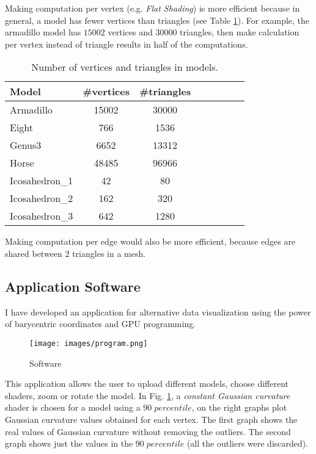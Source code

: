 Making computation per vertex (e.g. \textit{Flat Shading}) is more efficient because in general, a model has fewer vertices than triangles (see Table \ref{table:model-table-vertices}).
For example, the armadillo model has $15002$ vertices and $30000$ triangles, then make calculation per vertex instead of triangle results in half of the computations.

\begin{table}[!h]
    \centering
\begin{tabular}{l*{6}{c}r}
    \centering
    Model              & \#vertices & \#triangles \\
    \hline
    Armadillo          & 15002 & 30000 \\
    Eight              & 766 & 1536 \\
    Genus3             & 6652 & 13312  \\
    Horse              & 48485 &  96966\\
    Icosahedron\_1      &  42 & 80 \\
    Icosahedron\_2      &  162 & 320 \\
    Icosahedron\_3      & 642 &  1280
\end{tabular}
\caption{Number of vertices and triangles in models.}
\label{table:model-table-vertices}
\end{table}

Making computation per edge would also be more efficient, because edges are shared between $2$ triangles in a mesh.

\subsection{Application Software}
I have developed an application for alternative data visualization using the power of barycentric coordinates and GPU programming.
\begin{figure}[!h]
    \texttt{[image: images/program.png]}
    \caption{Software}
    \label{fig:software}
\end{figure}
This application allows the user to upload different models, choose different shaders, zoom or rotate the model.
In Fig. \ref{fig:software}, a \textit{constant Gaussian curvature} shader is chosen for a model using a $90 \; percentile$, on the right graphs plot Gaussian curvature values obtained for each vertex. The first graph shows the real values of Gaussian curvature without removing the outliers. The second graph shows just the values in the $90 \; percentile$ (all the outliers were discarded).

